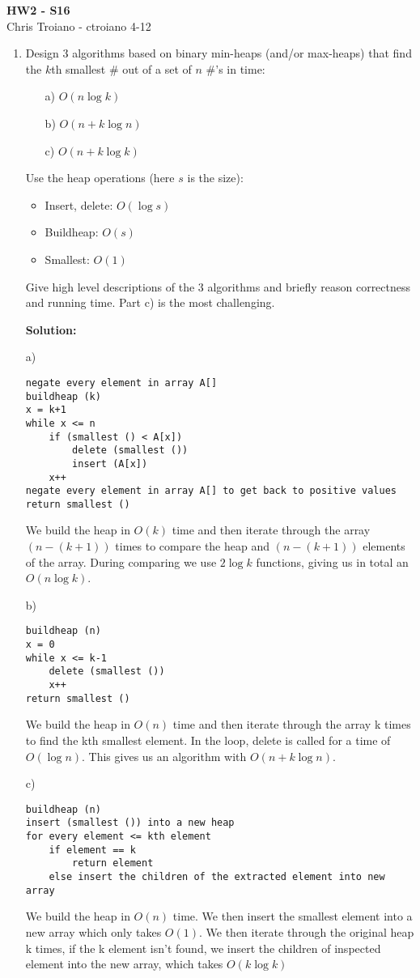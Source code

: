\documentclass[11pt]{article}
\begin{document}
\begin{center}
{\bf\large HW2 - S16}\\
\hfill Chris Troiano - ctroiano \hfill 4-12 \\
\end{center}

\begin{enumerate}
\item Design 3 algorithms based on binary min-heaps (and/or max-heaps) that find the $k$th smallest \# out of a set of $n$ \#'s in time:
\begin{enumerate}
\item[a)] $O(n \log k)$
\item[b)] $O(n + k \log n)$
\item[c)] $O(n + k \log k)$
\end{enumerate}

Use the heap operations (here $s$ is the size):
\begin{itemize}
\item   Insert, delete: $O(\log s)$
\item   Buildheap: $O(s)$
\item   Smallest: $O(1)$
\end{itemize}
  
Give high level descriptions of the 3 algorithms and briefly reason correctness and running time. Part c) is the most challenging.

\textbf{Solution:}
\item[a)]
\begin{verbatim}
negate every element in array A[]
buildheap (k)
x = k+1
while x <= n
	if (smallest () < A[x])
		delete (smallest ())
        insert (A[x])
    x++
negate every element in array A[] to get back to positive values
return smallest ()
\end{verbatim}
We build the heap in $O(k)$ time and then iterate through the array $(n - (k+1))$ times to compare the heap and $(n - (k+1))$ elements of the array. During comparing we use $2 \log k$ functions, giving us in total an $O(n \log k)$. 

\item[b)]
\begin{verbatim}
buildheap (n)
x = 0
while x <= k-1
	delete (smallest ())
    x++
return smallest ()
\end{verbatim}
We build the heap in $O(n)$ time and then iterate through the array k times to find the kth smallest element. In the loop, delete is called for a time of $O(\log n)$. This gives us an algorithm with $O(n + k \log n)$.
\item[c)]
\begin{verbatim}
buildheap (n)
insert (smallest ()) into a new heap
for every element <= kth element
	if element == k
    	return element
    else insert the children of the extracted element into new array
\end{verbatim}
We build the heap in $O(n)$ time. We then insert the smallest element into a new array which only takes $O(1)$. We then iterate through the original heap k times, if the k element isn't found, we insert the children of inspected element into the new array, which takes $O(k \log k)$
\vspace*{.2cm}


\end{enumerate}
\end{document}
